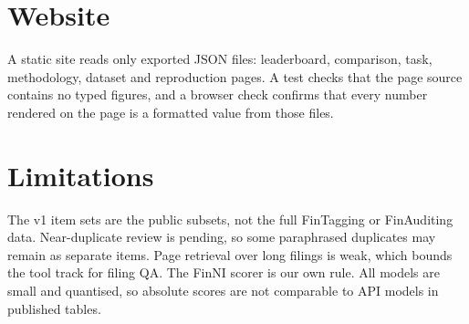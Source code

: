\documentclass[10pt,twocolumn,a4paper]{article}
\begin{document}
\section{Website}
A static site reads only exported JSON files: leaderboard, comparison, task, methodology, dataset and
reproduction pages. A test checks that the page source contains no typed figures, and a browser check
confirms that every number rendered on the page is a formatted value from those files.

\section{Limitations}
The v1 item sets are the public subsets, not the full FinTagging or FinAuditing data. Near-duplicate
review is pending, so some paraphrased duplicates may remain as separate items. Page retrieval over
long filings is weak, which bounds the tool track for filing QA. The FinNI scorer is our own rule. All
models are small and quantised, so absolute scores are not comparable to API models in published
tables.



\end{document}
